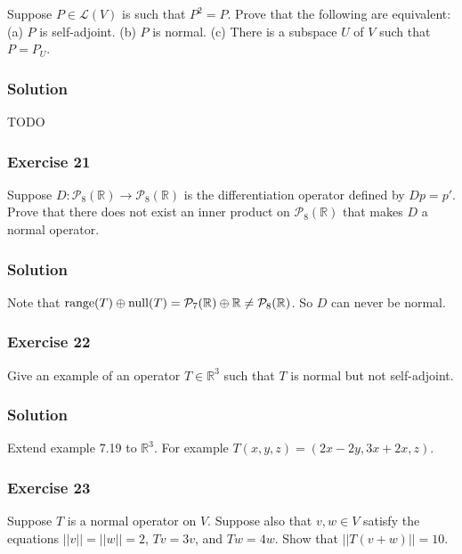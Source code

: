Suppose $P \in \mathcal{L}(V)$ is such that $P^2 = P$.
Prove that the following are equivalent: (a) $P$ is self-adjoint. (b) $P$ is normal. (c) There is a subspace $U$ of $V$ such that $P = P_U$.

\subsubsection*{Solution}

TODO


\subsubsection*{Exercise 21}

Suppose $D: \mathcal{P}_8(\mathbb{R}) \to \mathcal{P}_8(\mathbb{R})$ is the differentiation operator defined by $Dp = p'$.
Prove that there does not exist an inner product on $\mathcal{P}_8(\mathbb{R})$ that makes $D$ a normal operator.

\subsubsection*{Solution}

Note that $\mathrm{range}(T) \oplus \mathrm{null}(T) = \mathcal{P}_7(\mathbb{R}) \oplus \mathbb{R} \neq \mathcal{P}_8(\mathbb{R})$.
So $D$ can never be normal.


\subsubsection*{Exercise 22}

Give an example of an operator $T \in \mathbb{R}^3$ such that $T$ is normal but not self-adjoint.

\subsubsection*{Solution}

Extend example 7.19 to $\mathbb{R}^3$.
For example $T(x, y, z) = (2x - 2y, 3x + 2x, z)$.


\subsubsection*{Exercise 23}

Suppose $T$ is a normal operator on $V$.
Suppose also that $v, w \in V$ satisfy the equations $||v|| = ||w|| = 2$, $Tv = 3v$, and $Tw = 4w$.
Show that $||T(v + w)|| = 10$.

